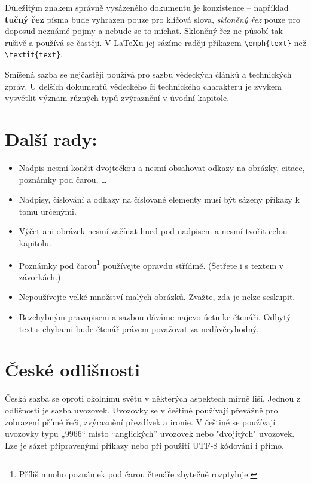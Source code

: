 \documentclass[a4paper,10pt,twocolumn]{article}
\begin{document}
Důležitým znakem správně vysázeného dokumentu je konzistence -- například \textbf{tučný řez} písma bude vyhrazen pouze pro klíčová slova, \emph{skloněný řez} pouze pro doposud neznámé pojmy a nebude se to míchat. Skloněný řez ne-\linebreak působí tak rušivě a používá se častěji. V LaTeXu jej sázíme raději příkazem \verb|\emph{text}| než \verb|\textit{text}|.

Smíšená sazba se nejčastěji používá pro sazbu vědeckých článků a technických zpráv. U delších dokumentů vědeckého či technického charakteru je zvykem vysvětlit význam různých typů zvýraznění v úvodní kapitole.

\section{Další rady:}
\label{sec:dalsi}

\begin{itemize}
	\item Nadpis nesmí končit dvojtečkou a nesmí obsahovat odkazy na obrázky, citace, poznámky pod čarou, \dots
	\item Nadpisy, číslování a odkazy na číslované elementy musí být sázeny příkazy k tomu určenými.
	\item Výčet ani obrázek nesmí začínat hned pod nadpisem a nesmí tvořit celou kapitolu.
	\item Poznámky pod čarou\footnote{Příliš mnoho poznámek pod čarou čtenáře zbytečně rozptyluje.} používejte opravdu střídmě. (Šetřete i s textem v závorkách.)
	\item Nepoužívejte velké množství malých obrázků. Zvažte, zda je nelze seskupit.
	\item Bezchybným pravopisem a sazbou dáváme najevo úctu ke čtenáři. Odbytý text s chybami bude čtenář právem považovat za nedůvěryhodný.
\end{itemize}

\section{České odlišnosti}
Česká sazba se oproti okolnímu světu v některých aspektech mírně liší. Jednou z odlišností je sazba uvozovek. Uvozovky se v češtině používají převážně pro zobrazení přímé řeči, zvýraznění přezdívek a ironie. V češtině se používají uvozovky typu „9966“ místo “anglických” uvozovek nebo "dvojitých" uvozovek. Lze je sázet připravenými příkazy nebo při použití UTF-8 kódování i přímo.
\end{document}
